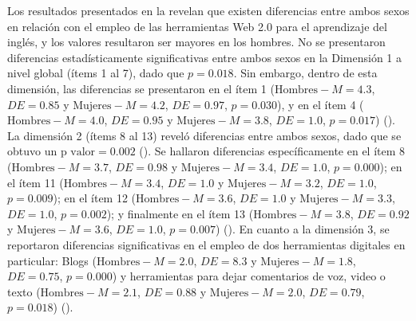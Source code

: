 \documentclass[spanish]{textolivre}
\begin{document}
Los resultados presentados en la  revelan que existen diferencias entre ambos sexos en relación con el empleo de las herramientas Web 2.0 para el aprendizaje del inglés, y los valores resultaron ser mayores en los hombres. No se presentaron diferencias estadísticamente significativas entre ambos sexos en la Dimensión 1 a nivel global (ítems 1 al 7), dado que $p = \num{0,018}$. Sin embargo, dentro de esta dimensión, las diferencias se presentaron en el ítem 1 ($\text{Hombres} - M = \num{4,3}$, $DE = \num{0,85}$ y $\text{Mujeres} - M = \num{4,2}$, $DE = \num{0,97}$, $p = \num{0,030}$), y en el ítem 4 ($\text{Hombres} - M = \num{4,0}$, $DE = \num{0,95}$ y $\text{Mujeres} - M = \num{3,8}$, $DE = \num{1,0}$, $p = \num{0,017}$) (). La dimensión 2 (ítems 8 al 13) reveló diferencias entre ambos sexos, dado que se obtuvo un $\text{p valor} = \num{0,002}$ (). Se hallaron diferencias específicamente en el ítem 8 ($\text{Hombres} - M = \num{3,7}$, $DE = \num{0,98}$ y $\text{Mujeres} - M = \num{3,4}$, $DE = \num{1,0}$, $p = \num{0,000}$); en el ítem 11 ($\text{Hombres} - M = \num{3,4}$, $DE = \num{1,0}$ y $\text{Mujeres} - M = \num{3,2}$, $DE = \num{1,0}$, $p = \num{0,009}$); en el ítem 12 ($\text{Hombres} - M = \num{3,6}$, $DE = \num{1,0}$ y $\text{Mujeres} - M = \num{3,3}$, $DE = \num{1,0}$, $p = \num{0,002}$); y finalmente en el ítem 13 ($\text{Hombres} - M = \num{3,8}$, $DE = \num{0,92}$ y $\text{Mujeres} - M = \num{3,6}$, $DE = \num{1,0}$, $p = \num{0,007}$) (). En cuanto a la dimensión 3, se reportaron diferencias significativas en el empleo de dos herramientas digitales en particular: Blogs ($\text{Hombres} - M = \num{2,0}$, $DE = \num{8,3}$ y $\text{Mujeres} - M = \num{1,8}$, $DE = \num{0,75}$, $p = \num{0,000}$) y herramientas para dejar comentarios de voz, video o texto ($\text{Hombres} - M = \num{2,1}$, $DE = \num{0,88}$ y $\text{Mujeres} - M = \num{2,0}$, $DE = \num{0,79}$, $p = \num{0,018}$) ().
\end{document}
